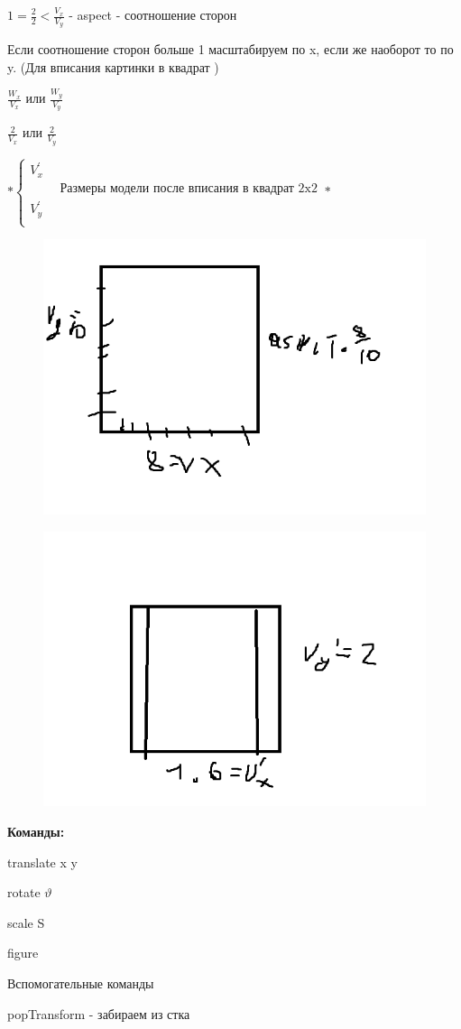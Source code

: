 \documentclass{article}
\begin{document}
$1 = \frac{2}{2} < \frac{V_x}{V_y}$ - aspect - соотношение сторон

Если соотношение сторон больше 1 масштабируем по x, если же наоборот то по y.
 (Для вписания картинки в квадрат )

$\frac{W_x}{V_x}$ или $\frac{W_y}{V_y}$


$\frac{2}{V_x}$ или $\frac{2}{V_y}$




$* \begin{cases}
 V_{x}^{'} \\  
\hspace{1cm} \text{Размеры модели после вписания в квадрат 2x2} \\
V_{y}^{'} \\
\end{cases} *$


\begin{figure} [H]
    \includegraphics[width=0.50\linewidth]{1.png}
\end{figure}

\begin{figure} [H]
    \includegraphics[width=0.50\linewidth]{2.png}
\end{figure}

\textbf{Команды:}

translate x  y


rotate $\vartheta$


scale S


figure 

Вспомогательные команды

popTransform - забираем из стка
\end{document}
